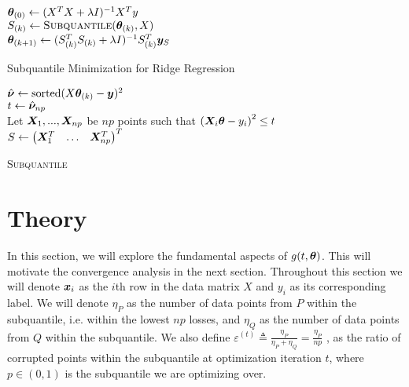\documentclass{article} %
\begin{document}
	\begin{minipage}{0.48\textwidth}
		\begin{algorithm}[H]
			${\bm{\theta}}_{(0)} \gets (X^T X + \lambda I)^{-1}X^T y$\\
			{
				$S_{(k)} \gets \textsc{Subquantile}({\bm{\theta}}_{(k)},X)$\\
				${\bm{\theta}}_{(k+1)} \gets (S_{(k)}^T S_{(k)} + \lambda I)^{-1}S_{(k)}^T {\bm{y}}_S$\\
			}
			\caption{Subquantile Minimization for Ridge Regression}
			\label{alg:sqo-ridge}
		\end{algorithm}
		\begin{algorithm}[H]
			$\hat{{\bm{\nu}}} \gets \operatorname*{sorted}(X {\bm{\theta}}_{(k)} - {\bm{y}})^2$\\
			$t \gets \hat{{\bm{\nu}}}_{np}$\\
			Let ${\bm{X}}_1,...,{\bm{X}}_{np}$ be $np$ points such that $\left({\bm{X}}_i {\bm{\theta}} - y_i\right)^2 \leq t$\\
			$S \gets \begin{pmatrix} {\bm{X}}_1^T & \dots & {\bm{X}}_{np}^T\end{pmatrix}^T$\\
			\caption{\textsc{Subquantile}}
		\end{algorithm}
	\end{minipage}


	\section{Theory} 
	In this section, we will explore the fundamental aspects of $g(t,{\bm{\theta}})$. This will motivate the convergence analysis in the next section. Throughout this section we will denote ${\bm{x}}_i$ as the $i$th row in the data matrix $X$ and $y_i$ as its corresponding label. We will denote $\eta_P$ as the number of data points from $P$ within the subquantile, i.e. within the lowest $np$ losses, and $\eta_Q$ as the number of data points from $Q$ within the subquantile. We also define $\varepsilon^{(t)} \triangleq \frac{\eta_P}{\eta_P + \eta_Q} = \frac{\eta_P}{np}$ , as the ratio of corrupted points within the subquantile at optimization iteration $t$, where $p \in (0,1)$ is the subquantile we are optimizing over. 
	
\end{document}
